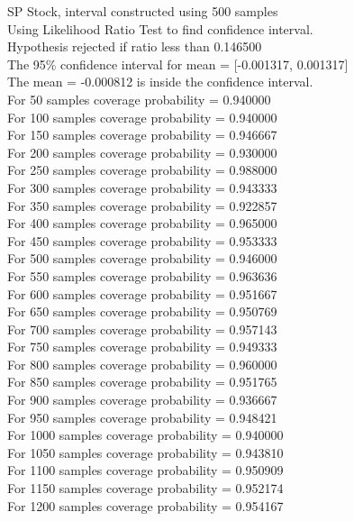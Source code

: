 \documentclass{article}
\begin{document}
SP Stock, interval constructed using 500 samples\\
Using Likelihood Ratio Test to find confidence interval.\\
Hypothesis rejected if ratio less than 0.146500\\
The 95\% confidence interval for mean = [-0.001317, 0.001317]\\
The mean = -0.000812 is inside the confidence interval.\\
For 50 samples coverage probability = 0.940000\\
For 100 samples coverage probability = 0.940000\\
For 150 samples coverage probability = 0.946667\\
For 200 samples coverage probability = 0.930000\\
For 250 samples coverage probability = 0.988000\\
For 300 samples coverage probability = 0.943333\\
For 350 samples coverage probability = 0.922857\\
For 400 samples coverage probability = 0.965000\\
For 450 samples coverage probability = 0.953333\\
For 500 samples coverage probability = 0.946000\\
For 550 samples coverage probability = 0.963636\\
For 600 samples coverage probability = 0.951667\\
For 650 samples coverage probability = 0.950769\\
For 700 samples coverage probability = 0.957143\\
For 750 samples coverage probability = 0.949333\\
For 800 samples coverage probability = 0.960000\\
For 850 samples coverage probability = 0.951765\\
For 900 samples coverage probability = 0.936667\\
For 950 samples coverage probability = 0.948421\\
For 1000 samples coverage probability = 0.940000\\
For 1050 samples coverage probability = 0.943810\\
For 1100 samples coverage probability = 0.950909\\
For 1150 samples coverage probability = 0.952174\\
For 1200 samples coverage probability = 0.954167\\
\end{document}
